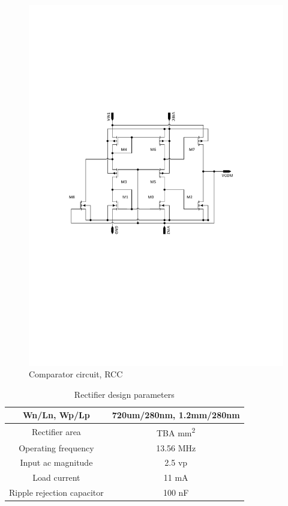 \documentclass[12pt,a4paper,UKenglish]{report}
\begin{document}
\begin{figure}[H] %
   \centering
   \includegraphics[width=\textwidth]{img/visio/visio_rcc.pdf} 
   \caption{Comparator circuit, RCC }
   \label{rcc}
\end{figure}

\begin{table}[H]
\caption{Rectifier design parameters}
\begin{center}
\begin{tabular}{c|c}
\hline \hline
Wn/Ln, Wp/Lp 		& 720um/280nm, 1.2mm/280nm \\ \hline
Rectifier area 		& TBA mm\textsuperscript{2} \\ \hline
Operating frequency 	& 13.56 MHz \\ \hline
Input ac magnitude	& 2.5  \acrshort{vp}\\ \hline
Load current 		& 11 mA \\ \hline
Ripple rejection capacitor	& 100 nF \\ 
\hline \hline
\end{tabular}
\end{center}
\label{tab:rect_parameter}
\end{table}
\end{document}
